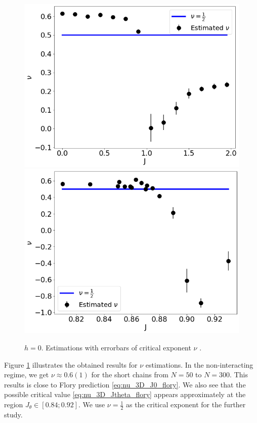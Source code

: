  \begin{figure}[H]
	\centering
	\includegraphics[scale=0.36]{Images/3_nu_shortchains.png}
	\includegraphics[scale=0.36]{Images/3_nu_shortchains_deep.png}
	\caption{$h=0$. Estimations with errorbars of critical exponent $\nu$ .   }
	\label{fig:nushort3D}
\end{figure}

Figure \ref{fig:nushort3D} illustrates the obtained results for $\nu$ estimations. In the non-interacting regime, we get $\nu \approx 0.6(1) $ for the short chains from $N=50$ to $N=300$. This results is close to Flory prediction \eqref{eq:nu_3D_J0_flory}. We also see that the possible critical value \eqref{eq:nu_3D_Jtheta_flory} appears approximately at the region $J_{\theta} \in [0.84; 0.92]$. We use $\nu = \frac{1}{2}$ as the critical exponent for the further study. 

